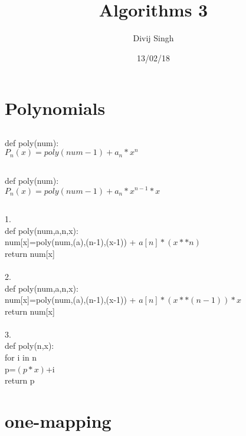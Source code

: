 \documentclass{article}
\title{Algorithms 3}
\author{Divij Singh}
\date{13/02/18}
\begin{document}
	\maketitle
	
	\section{Polynomials}
	
	\subsection{}
		def poly(num):\\
			$P_n (x) = poly(num-1) + a_n * x^n$
	
	\subsection{}
	
		def poly(num):\\
			$P_n (x) = poly(num-1) + a_n * x^{n-1} * x$
			
	\subsection{}
		
		1.\\
		def poly(num,a,n,x):\\
		 num[x]=poly(num,(a),(n-1),(x-1)) + $a[n]*(x**n)$\\
		return num[x]\\
		\\
		2.\\
		def poly(num,a,n,x):\\
		 num[x]=poly(num,(a),(n-1),(x-1)) + $a[n]*(x**(n-1))*x$\\
		return num[x]\\
		\\
		3.\\
		def poly(n,x):\\
		 for i in n\\
		  p=$(p*x)$+i\\
		return p\\
		
	
	\section{one-mapping}
	\subsection{}
		
\end{document}
